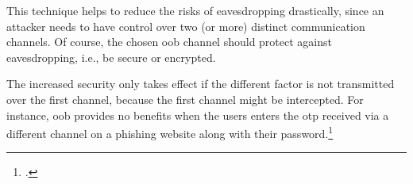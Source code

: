 This technique helps to reduce the risks of eavesdropping drastically, since an attacker needs to have control over two (or more) distinct communication channels. Of course, the chosen \gls{oob} channel should protect against eavesdropping, i.e., be secure or encrypted.

The increased security only takes effect if the different factor is not transmitted over the first channel, because the first channel might be intercepted. For instance, \gls{oob} provides no benefits when the users enters the \gls{otp} received via a different channel on a phishing website along with their password.\footcites[See][17]{SP80063B}[See][441]{doi:10.1002/9781118256107.ch37}[See][140]{brotherston2017defensive}[See][106]{2241278}

